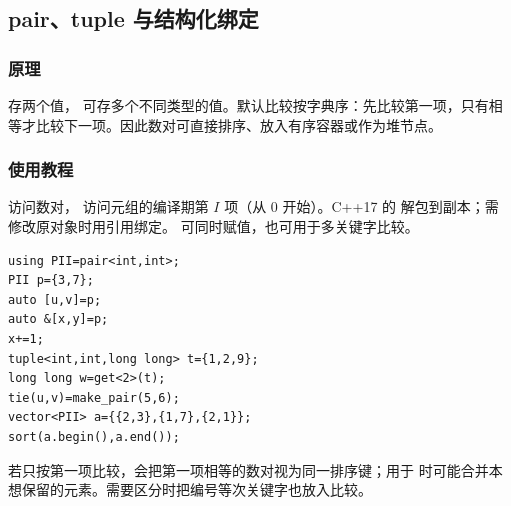 \subsection{pair、tuple 与结构化绑定}
\label{stl:pair-tuple}
\subsubsection*{原理}
 存两个值， 可存多个不同类型的值。默认比较按字典序：先比较第一项，只有相等才比较下一项。因此数对可直接排序、放入有序容器或作为堆节点。
\subsubsection*{使用教程}
 访问数对， 访问元组的编译期第 $I$ 项（从 0 开始）。C++17 的  解包到副本；需修改原对象时用引用绑定。 可同时赋值，也可用于多关键字比较。
\begin{lstlisting}[style=mtycpp,numbers=none]
using PII=pair<int,int>;
PII p={3,7};
auto [u,v]=p;
auto &[x,y]=p;
x+=1;
tuple<int,int,long long> t={1,2,9};
long long w=get<2>(t);
tie(u,v)=make_pair(5,6);
vector<PII> a={{2,3},{1,7},{2,1}};
sort(a.begin(),a.end());
\end{lstlisting}
若只按第一项比较，会把第一项相等的数对视为同一排序键；用于  时可能合并本想保留的元素。需要区分时把编号等次关键字也放入比较。
